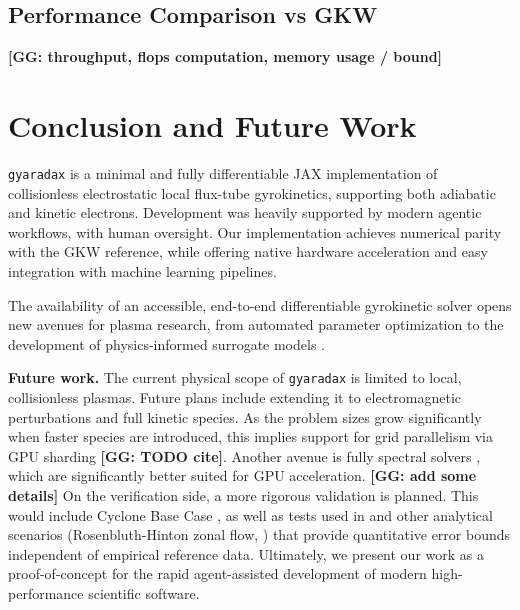 \documentclass{article}
\theoremstyle{plain}
\theoremstyle{definition}
\theoremstyle{remark}
\newcommand{\GG}[1]{\textcolor{jaxtealdark}{\textbf{[GG: #1]}}}
\begin{document}

\subsection{Performance Comparison vs GKW}
\GG{throughput, flops computation, memory usage / bound}


\section{Conclusion and Future Work}
\texttt{gyaradax} is a minimal and fully differentiable JAX implementation of collisionless electrostatic local flux-tube gyrokinetics, supporting both adiabatic and kinetic electrons.
Development was heavily supported by modern agentic workflows, with human oversight.
%
Our implementation achieves numerical parity with the GKW reference, while offering native hardware acceleration and easy integration with machine learning pipelines.

The availability of an accessible, end-to-end differentiable gyrokinetic solver opens new avenues for plasma research, from automated parameter optimization \cite{McGreivy_2021,joglekar2026differentiableprogrammingplasmaphysics} to the development of physics-informed surrogate models \cite{um2021solverinthelooplearningdifferentiablephysics,Karniadakis2021}.

\textbf{Future work.}
The current physical scope of \texttt{gyaradax} is limited to local, collisionless plasmas.
Future plans include extending it to electromagnetic perturbations and full kinetic species.
As the problem sizes grow significantly when faster species are introduced, this implies support for grid parallelism via GPU sharding \GG{TODO cite}.
Another avenue is fully spectral solvers \cite{CANDY201673}, which are significantly better suited for GPU acceleration. \GG{add some details}
%
On the verification side, a more rigorous validation is planned. This would include Cyclone Base Case \cite{cbc}, as well as tests used in \citet{PEETERS_GKW_2009} and other analytical scenarios (Rosenbluth-Hinton zonal flow, \citet{Rosenbluth}) that provide quantitative error bounds independent of empirical reference data.
%
Ultimately, we present our work as a proof-of-concept for the rapid agent-assisted development of modern high-performance scientific software.



\end{document}
